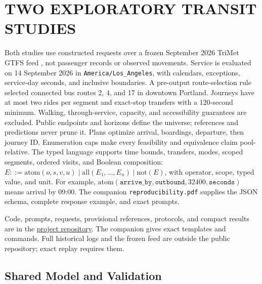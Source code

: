 \documentclass[a4paper,twoside]{article}
\begin{document}
\section{\uppercase{Two Exploratory Transit Studies}}
\label{sec:setup}

\noindent Both studies use constructed requests over a frozen September 2026 TriMet GTFS feed \cite{trimet,gtfs}, not passenger records or observed movements. Service is evaluated on 14 September 2026 in \texttt{America/Los\_Angeles}, with calendars, exceptions, service-day seconds, and inclusive boundaries.
A pre-output route-selection rule selected connected bus routes 2, 4, and 17 in downtown Portland. Journeys have at most two rides per segment and exact-stop transfers with a 120-second minimum. Walking, through-service, capacity, and accessibility guarantees are excluded. Public endpoints and horizons define the universe; references and predictions never prune it. Plans optimize arrival, boardings, departure, then journey ID. Enumeration caps make every feasibility and equivalence claim pool-relative.
The typed language supports time bounds, transfers, modes, scoped segments, ordered visits, and Boolean composition: $E::=\mathrm{atom}(o,s,v,u)\mid\mathrm{all}(E_1,\ldots,E_n)\mid\mathrm{not}(E)$, with operator, scope, typed value, and unit. For example, $\mathrm{atom}(\texttt{arrive\_by},\texttt{outbound},32400,\texttt{seconds})$ means arrival by 09:00. The companion \texttt{reproducibility.pdf} supplies the JSON schema, complete response example, and exact prompts. 


Code, prompts, requests, provisional references, protocols, and compact results are in the \href{https://github.com/mantzaris/LLMplanningContraintsDecision}{project repository}. The companion gives exact templates and commands. Full historical logs and the frozen feed are outside the public repository; exact replay requires them.

\subsection{Shared Model and Validation}
\end{document}
